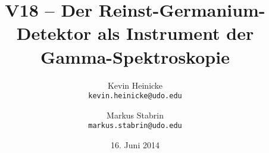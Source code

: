 \documentclass[%
    a4paper,%
    twoside,%
    BCOR12mm,%
    DIV13,%
    bibtotoc,%
    openany,%
    captions=tableheading,
]{scrartcl}
\title{%
        V18 -- Der Reinst-Germanium-Detektor als Instrument der Gamma-Spektroskopie
    }
\author{%
        Kevin Heinicke\\
        \texttt{kevin.heinicke@udo.edu}
        \and
        Markus Stabrin\\
        \texttt{markus.stabrin@udo.edu}
    }
\date{16. Juni 2014}
\begin{document}
    \maketitle%
    \tableofcontents
    \newpage

    
    

    \FloatBarrier
    
    
\end{document}
